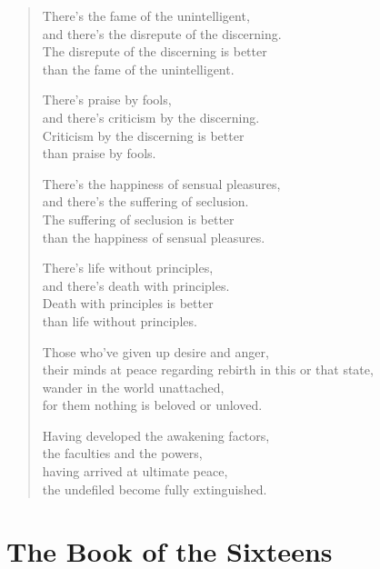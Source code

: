 \documentclass[12pt,openany]{book}%
\let\oldcontentsline\contentsline
\newcommand{\nopagecontentsline}[3]{\oldcontentsline{#1}{#2}{}}
\begin{document}
\begin{verse}
There’s the fame of the unintelligent, \\
and there’s the disrepute of the discerning. \\
The disrepute of the discerning is better \\
than the fame of the unintelligent. 

There’s praise by fools, \\
and there’s criticism by the discerning. \\
Criticism by the discerning is better \\
than praise by fools. 

There’s the happiness of sensual pleasures, \\
and there’s the suffering of seclusion. \\
The suffering of seclusion is better \\
than the happiness of sensual pleasures. 

There’s life without principles, \\
and there’s death with principles. \\
Death with principles is better \\
than life without principles. 

Those who’ve given up desire and anger, \\
their minds at peace regarding rebirth in this or that state, \\
wander in the world unattached, \\
for them nothing is beloved or unloved. 

Having developed the awakening factors, \\
the faculties and the powers, \\
having arrived at ultimate peace, \\
the undefiled become fully extinguished. 

%
\end{verse}

%
\part*{The Book of the Sixteens}
\markboth{}{}
\addtocontents{toc}{\let\protect\contentsline\protect\oldcontentsline}

%
\end{document}
